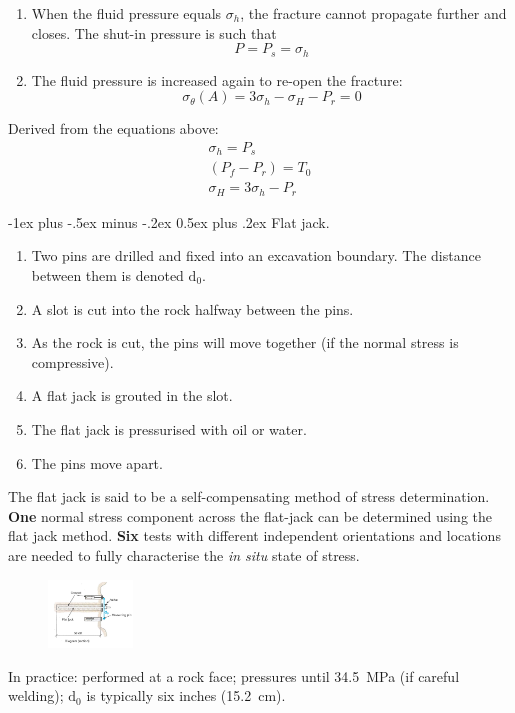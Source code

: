 \documentclass[10pt,landscape,a4paper]{article}
\makeatletter
\renewcommand{\section}{\@startsection{section}{1}{0mm}%
	{-1ex plus -.5ex minus -.2ex}%
	{0.5ex plus .2ex}%
	{\normalfont\large\bfseries}}
\makeatother
\begin{document}
\begin{multicols}{3}
\begin{enumerate}
			\item When the fluid pressure equals $\sigma_h$, the fracture cannot propagate further and closes. The shut-in pressure is such that
			\[
				P=P_s=\sigma_h
			\]
			\item The fluid pressure is increased again to re-open the fracture:
			\[
				\sigma_\theta(A)=3\sigma_h-\sigma_H-P_r=0
			\]
		\end{enumerate}
		Derived from the equations above:
		\begin{align*}
			\sigma_h=P_s\\
			(P_f-P_r)=T_0\\
			\sigma_H=3\sigma_h-P_r
		\end{align*}
		
		\section{Flat jack.}
		\begin{enumerate}
			\item Two pins are drilled and fixed into an excavation boundary. The distance between them is denoted $\text{d}_0$.
			\item A slot is cut into the rock halfway between the pins.
			\item As the rock is cut, the pins will move together (if the normal stress is compressive).
			\item A flat jack is grouted in the slot.
			\item The flat jack is pressurised with oil or water.
			\item The pins move apart.
		\end{enumerate}
		The flat jack is said to be a self-compensating method of stress determination.
		\textbf{One} normal stress component across the flat-jack can be determined using the flat jack method.
		\textbf{Six} tests with different independent orientations and locations are needed to fully characterise the \textit{in situ} state of stress.
		\begin{figure}[H]
			\centering
			\includegraphics[width=0.2\textwidth]{flat-jack}
		\end{figure}
		In practice: performed at a rock face; pressures until \SI{34.5}{\mega\pascal} (if careful welding); $\text{d}_0$ is typically six inches (\SI{15.2}{\centi\meter}).
		

\end{multicols}
\end{document}
